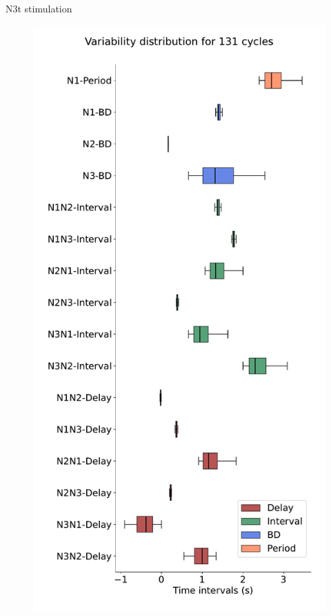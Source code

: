 \documentclass[aspectratio=43]{beamer}
\begin{document}
\begin{frame}{N3t stimulation}
	\begin{figure}[hbt!]
		\begin{minipage}[b]{0.36\textwidth}
			\centering
			\includegraphics[width=\textwidth]{invariants/data/MODEL/n3t_driven/images/3phases/_boxplot.pdf}

\end{minipage}
\end{figure}
\end{frame}
\end{document}
